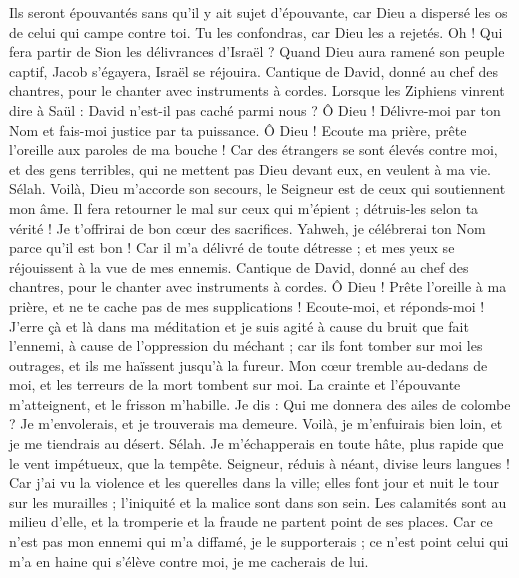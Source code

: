 \begin{multicols}{2}
Ils seront épouvantés sans qu'il y ait sujet d'épouvante, car Dieu a dispersé les os de celui qui campe contre toi. Tu les confondras, car Dieu les a rejetés.
Oh ! Qui fera partir de Sion les délivrances d'Israël ? Quand Dieu aura ramené son peuple captif, Jacob s'égayera, Israël se réjouira.
\VerseOne{}Cantique de David, donné au chef des chantres, pour le chanter avec instruments à cordes.
Lorsque les Ziphiens vinrent dire à Saül : David n'est-il pas caché parmi nous ?
Ô Dieu ! Délivre-moi par ton Nom et fais-moi justice par ta puissance.
Ô Dieu ! Ecoute ma prière, prête l'oreille aux paroles de ma bouche !
Car des étrangers se sont élevés contre moi, et des gens terribles, qui ne mettent pas Dieu devant eux, en veulent à ma vie. Sélah.
Voilà, Dieu m'accorde son secours, le Seigneur est de ceux qui soutiennent mon âme.
Il fera retourner le mal sur ceux qui m'épient ; détruis-les selon ta vérité !
Je t'offrirai de bon cœur des sacrifices. Yahweh, je célébrerai ton Nom parce qu'il est bon !
Car il m'a délivré de toute détresse ; et mes yeux se réjouissent à la vue de mes ennemis.
\VerseOne{}Cantique de David, donné au chef des chantres, pour le chanter avec instruments à cordes.
Ô Dieu ! Prête l'oreille à ma prière, et ne te cache pas de mes supplications !
Ecoute-moi, et réponds-moi ! J'erre çà et là dans ma méditation et je suis agité
à cause du bruit que fait l'ennemi, à cause de l'oppression du méchant ; car ils font tomber sur moi les outrages, et ils me haïssent jusqu'à la fureur.
Mon cœur tremble au-dedans de moi, et les terreurs de la mort tombent sur moi.
La crainte et l'épouvante m'atteignent, et le frisson m'habille.
Je dis : Qui me donnera des ailes de colombe ? Je m'envolerais, et je trouverais ma demeure.
Voilà, je m'enfuirais bien loin, et je me tiendrais au désert. Sélah.
Je m'échapperais en toute hâte, plus rapide que le vent impétueux, que la tempête.
Seigneur, réduis à néant, divise leurs langues ! Car j'ai vu la violence et les querelles dans la ville;
elles font jour et nuit le tour sur les murailles ; l'iniquité et la malice sont dans son sein.
Les calamités sont au milieu d'elle, et la tromperie et la fraude ne partent point de ses places.
Car ce n'est pas mon ennemi qui m'a diffamé, je le supporterais ; ce n'est point celui qui m'a en haine qui s'élève contre moi, je me cacherais de lui.

\end{multicols}
